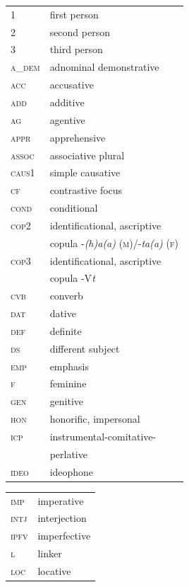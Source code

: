 \documentclass[output=paper,colorlinks,citecolor=brown,]{langscibook}
\begin{document}
\begin{tabularx}{.5\textwidth}{@{}lQ@{}}
\textsc{1} & first person\\
\textsc{2} & second person\\
\textsc{3} & third person\\
\textsc{a\_dem} &  adnominal demonstrative\\
\textsc{acc} &  accusative\\
\textsc{add} &  additive\\
\textsc{ag} &  agentive\\
\textsc{appr} &  apprehensive\\
\textsc{assoc} &  associative plural\\
\textsc{caus1} &  simple causative\\
\textsc{cf} &  contrastive focus\\
\textsc{cond} &  conditional\\
\textsc{cop2} &  identificational, ascriptive \\ &  copula  -\textit{(h)a(a)} (\textsc{m})/-\textit{ta(a)} (\textsc{f})\\
\textsc{cop3} &  identificational, ascriptive \\ &  copula -V\textit{t}\\
\textsc{cvb} &  converb\\
\textsc{dat} &  dative\\
\textsc{def} &  definite\\
\textsc{ds} &  different subject\\
\textsc{emp} &  emphasis\\
\textsc{f} &  feminine\\
\textsc{gen} &  genitive\\
\textsc{hon} &  honorific, impersonal\\
\textsc{icp} &  instrumental-comitative-\\ &  perlative\\
\textsc{ideo} &  ideophone\end{tabularx}\begin{tabularx}{.5\textwidth}{@{}lQ@{}}
\textsc{imp} &  imperative\\
\textsc{intj} &  interjection\\
\textsc{ipfv} &  imperfective\\
\textsc{l} &  linker\\
\textsc{loc} &  locative\\

\end{tabularx}
\end{document}
